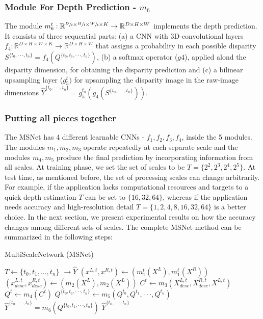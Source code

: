 \documentclass[runningheads]{llncs}
\begin{document}
\subsubsection{Module For Depth Prediction - $m_6$}

The module $m_6^t: \mathbb{R}^{\sfrac{D}{t} \times \sfrac{H}{t} \times \sfrac{W}{t} \times K} \rightarrow \mathbb{R}^{D \times H \times W}$ implements the depth prediction. It consists of three sequential parts: (a) a CNN with 3D-convolutional layers $f_4: \mathbb{R}^{D \times H \times W \times K} \rightarrow \mathbb{R}^{D \times H \times W}$ that assigns a probability in each possible disparity $S^{\{ t_0, \cdot \cdot \cdot, t_n \}} = f_4(Q^{\{t_0, t_1, \cdot \cdot \cdot, t_n\}})$, (b) a softmax operator ($g4$), applied alond the disparity dimension, for obtaining the disparity prediction and (c) a bilinear upsampling layer ($g_5^t)$ for upsampling the disparity image in the raw-image dimensions $\hat{Y}^{\{ t_0, \cdot \cdot \cdot, t_n \}} = g_5^{t_0}(g_4(S^{\{ t_0, \cdot \cdot \cdot, t_n \}}))$.

\subsubsection{Putting all pieces together}

The MSNet has 4 different learnable CNNs - $f_1, f_2, f_3, f_4$, inside the 5 modules. The modules $m_1, m_2, m_3$ operate repeatedly at each separate scale and the modules $m_4, m_5$ produce the final prediction by incorporating information from all scales. At training phase, we set the set of scales to be $T = \{ 2^2, 2^3, 2^4, 2^5 \}$. At test time, as mentioned before, the set of processing scales can change arbitrarily. For example, if the application lacks computational resources and targets to a quick depth estimation $T$ can be set to $\{ 16, 32, 64\}$, whereas if the application needs accuracy and high-resolution detail $T = \{1, 2, 4, 8, 16, 32, 64 \}$ is a better choice. In the next section, we present experimental results on how the accuracy changes among different sets of scales. The complete MSNet method can be summarized in the following steps:


\begin{algorithm}
\caption{MultiScaleNetwork (MSNet)}\label{alg:MSNET}
\begin{algorithmic}[1]
\State $T \gets \{ t_0, t_1, ... , t_n\}$ 
 $\rightarrow \hat{Y}$ 
\State $(x^{L,t},  x^{R,t}) \gets (m_1^t(X^L),m_1^t(X^R)) $ 
\State $(x^{L,t}_{desc}, x^{R,t}_{desc}) \gets (m_2(X^L), m_2(X^L))$ 
\State $C^{t} \gets m_3(X^{L,t}_{desc}, X^{R,t}_{desc}, X^{L,t})$ 
\State $Q^{t} \gets m_4(C^{t})$ 
\EndFor
\State $Q^{\{t_0, t_1, \cdot \cdot \cdot, t_n\}} \gets m_5(Q^{t_0}, Q^{t_1}, \cdot \cdot \cdot, Q^{t_n})$ 
\State $\hat{Y}^{\{ t_0, \cdot \cdot \cdot, t_n \}} = m_6(Q^{\{t_0, t_1, \cdot \cdot \cdot, t_n\}}) $ 
\State \Return $\hat{Y}^{\{ t_0, \cdot \cdot \cdot, t_n \}} $
\EndProcedure
\end{algorithmic}
\end{algorithm}
\end{document}
